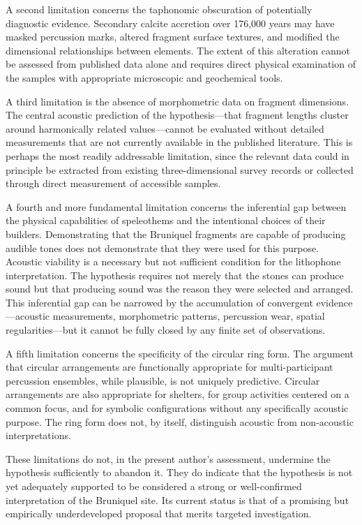 \documentclass[12pt]{article}
\begin{document}
A second limitation concerns the taphonomic obscuration of potentially diagnostic evidence. Secondary calcite accretion over 176,000 years may have masked percussion marks, altered fragment surface textures, and modified the dimensional relationships between elements. The extent of this alteration cannot be assessed from published data alone and requires direct physical examination of the samples with appropriate microscopic and geochemical tools.

A third limitation is the absence of morphometric data on fragment dimensions. The central acoustic prediction of the hypothesis—that fragment lengths cluster around harmonically related values—cannot be evaluated without detailed measurements that are not currently available in the published literature. This is perhaps the most readily addressable limitation, since the relevant data could in principle be extracted from existing three-dimensional survey records or collected through direct measurement of accessible samples.

A fourth and more fundamental limitation concerns the inferential gap between the physical capabilities of speleothems and the intentional choices of their builders. Demonstrating that the Bruniquel fragments are capable of producing audible tones does not demonstrate that they were used for this purpose. Acoustic viability is a necessary but not sufficient condition for the lithophone interpretation. The hypothesis requires not merely that the stones can produce sound but that producing sound was the reason they were selected and arranged. This inferential gap can be narrowed by the accumulation of convergent evidence—acoustic measurements, morphometric patterns, percussion wear, spatial regularities—but it cannot be fully closed by any finite set of observations.

A fifth limitation concerns the specificity of the circular ring form. The argument that circular arrangements are functionally appropriate for multi-participant percussion ensembles, while plausible, is not uniquely predictive. Circular arrangements are also appropriate for shelters, for group activities centered on a common focus, and for symbolic configurations without any specifically acoustic purpose. The ring form does not, by itself, distinguish acoustic from non-acoustic interpretations.

These limitations do not, in the present author's assessment, undermine the hypothesis sufficiently to abandon it. They do indicate that the hypothesis is not yet adequately supported to be considered a strong or well-confirmed interpretation of the Bruniquel site. Its current status is that of a promising but empirically underdeveloped proposal that merits targeted investigation.
\end{document}
